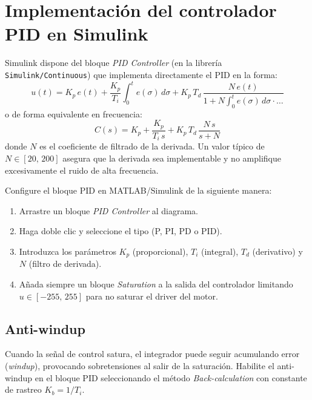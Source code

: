 \documentclass[12pt,a4paper]{article}
\begin{document}
\appendix
\section{Implementación del controlador PID en Simulink}

Simulink dispone del bloque \emph{PID Controller} (en la librería
\texttt{Simulink/Continuous}) que implementa directamente el PID en la forma:
\begin{equation}
  u(t) = K_p\,e(t) + \frac{K_p}{T_i}\int_0^t e(\sigma)\,d\sigma
         + K_p\,T_d\,\frac{N\,e(t)}{1 + N\int_0^t e(\sigma)\,d\sigma\cdot\ldots}
\end{equation}
o de forma equivalente en frecuencia:
\begin{equation}
  C(s) = K_p + \frac{K_p}{T_i\,s} + K_p\,T_d\,\frac{N\,s}{s+N}
\end{equation}
donde $N$ es el coeficiente de filtrado de la derivada. Un valor típico de
$N\in[20,\,200]$ asegura que la derivada sea implementable y no amplifique
excesivamente el ruido de alta frecuencia.

Configure el bloque PID en MATLAB/Simulink de la siguiente manera:
\begin{enumerate}[noitemsep]
  \item Arrastre un bloque \emph{PID Controller} al diagrama.
  \item Haga doble clic y seleccione el tipo (P, PI, PD o PID).
  \item Introduzca los parámetros $K_p$ (proporcional), $T_i$ (integral),
        $T_d$ (derivativo) y $N$ (filtro de derivada).
  \item Añada siempre un bloque \emph{Saturation} a la salida del controlador
        limitando $u\in[-255,\,255]$ para no saturar el driver del motor.
\end{enumerate}

\subsection*{Anti-windup}

Cuando la señal de control satura, el integrador puede seguir acumulando error
(\emph{windup}), provocando sobretensiones al salir de la saturación.
Habilite el anti-windup en el bloque PID seleccionando el método
\emph{Back-calculation} con constante de rastreo $K_b = 1/T_i$.
\end{document}
